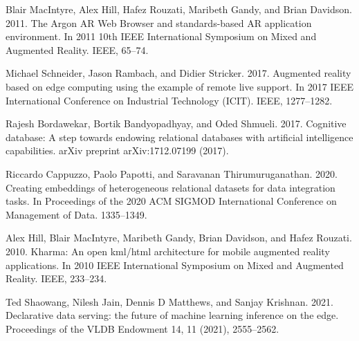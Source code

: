 \documentclass[11pt]{article}
\begin{document}
\begin{thebibliography}{10}
\begin{small}
 Blair MacIntyre, Alex Hill, Hafez Rouzati, Maribeth Gandy, and Brian Davidson. 2011. The Argon AR Web Browser and standards-based AR application environment. In 2011 10th IEEE International Symposium on Mixed and Augmented Reality. IEEE, 65–74.

 Michael Schneider, Jason Rambach, and Didier Stricker. 2017. Augmented reality based on edge computing using the example of remote live support. In 2017 IEEE International Conference on Industrial Technology (ICIT). IEEE, 1277–1282.

 Rajesh Bordawekar, Bortik Bandyopadhyay, and Oded Shmueli. 2017. Cognitive database: A step towards endowing relational databases with artificial intelligence capabilities. arXiv preprint arXiv:1712.07199 (2017).

 Riccardo Cappuzzo, Paolo Papotti, and Saravanan Thirumuruganathan. 2020. Creating embeddings of heterogeneous relational datasets for data integration tasks. In Proceedings of the 2020 ACM SIGMOD International Conference on Management of Data. 1335–1349.

 Alex Hill, Blair MacIntyre, Maribeth Gandy, Brian Davidson, and Hafez Rouzati. 2010. Kharma: An open kml/html architecture for mobile augmented reality applications. In 2010 IEEE International Symposium on Mixed and Augmented Reality. IEEE, 233–234.

 Ted Shaowang, Nilesh Jain, Dennis D Matthews, and Sanjay Krishnan. 2021. Declarative data serving: the future of machine learning inference on the edge. Proceedings of the VLDB Endowment 14, 11 (2021), 2555–2562.

\end{small} 
\end{thebibliography}
\end{document}
